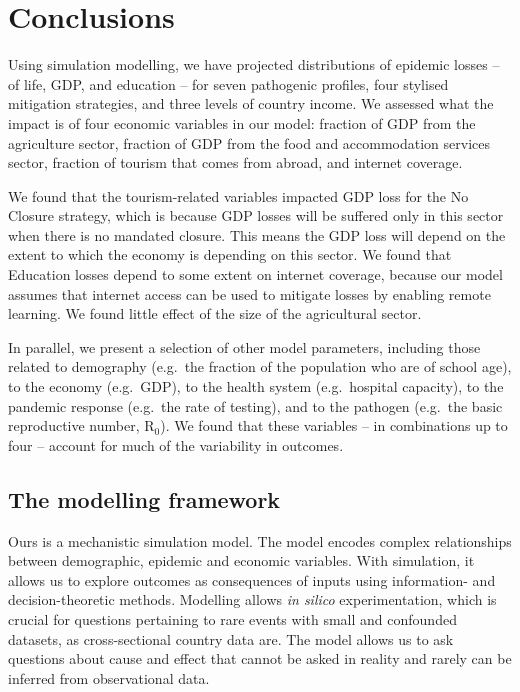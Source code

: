 \documentclass[
]{article}
\begin{document}
\newpage

\hypertarget{conclusions}{%
\section{Conclusions}\label{conclusions}}

Using simulation modelling, we have projected distributions of epidemic losses -- of life, GDP, and education -- for seven pathogenic profiles, four stylised mitigation strategies, and three levels of country income. We assessed what the impact is of four economic variables in our model: fraction of GDP from the agriculture sector, fraction of GDP from the food and accommodation services sector, fraction of tourism that comes from abroad, and internet coverage.

We found that the tourism-related variables impacted GDP loss for the No Closure strategy, which is because GDP losses will be suffered only in this sector when there is no mandated closure. This means the GDP loss will depend on the extent to which the economy is depending on this sector. We found that Education losses depend to some extent on internet coverage, because our model assumes that internet access can be used to mitigate losses by enabling remote learning. We found little effect of the size of the agricultural sector.

In parallel, we present a selection of other model parameters, including those related to demography (e.g.~the fraction of the population who are of school age), to the economy (e.g.~GDP), to the health system (e.g.~hospital capacity), to the pandemic response (e.g.~the rate of testing), and to the pathogen (e.g.~the basic reproductive number, R\(_0\)). We found that these variables -- in combinations up to four -- account for much of the variability in outcomes.

\hypertarget{the-modelling-framework}{%
\subsection{The modelling framework}\label{the-modelling-framework}}

Ours is a mechanistic simulation model. The model encodes complex relationships between demographic, epidemic and economic variables. With simulation, it allows us to explore outcomes as consequences of inputs using information- and decision-theoretic methods. Modelling allows \emph{in silico} experimentation, which is crucial for questions pertaining to rare events with small and confounded datasets, as cross-sectional country data are. The model allows us to ask questions about cause and effect that cannot be asked in reality and rarely can be inferred from observational data.
\end{document}
